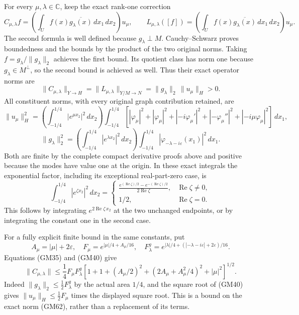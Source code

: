 \documentclass[
  11pt,
]{article}
\begin{document}
For every \(\mu,\lambda\in\mathbb C\), keep the exact rank-one correction
\[
 C_{\mu,\lambda}f
    =\left(\int_U f(x)\overline{g_\lambda(x)}\,dx_1\,dx_2\right)u_\mu,
 \qquad
 L_{\mu,\lambda}([f])
    =\left(\int_U f(x)\overline{g_\lambda(x)}\,dx_1\,dx_2\right)u_\mu .
 \tag{GM61}
\] The second formula is well defined because
\(g_\lambda\perp M\). Cauchy--Schwarz proves boundedness and the
bounds by the product of the two original norms. Taking
\(f=g_\lambda/\|g_\lambda\|_2\) achieves the first bound. Its quotient class
has norm one because \(g_\lambda\in M^\perp\), so the second bound is
achieved as well. Thus their exact operator norms are
\[
 \|C_{\mu,\lambda}\|_{Y\to H}
      =\|L_{\mu,\lambda}\|_{Y/M\to N}
      =\|g_\lambda\|_2\,\|u_\mu\|_H>0.
\] All constituent norms, with every original
graph contribution retained, are \[
 \|u_\mu\|_H^2
  =\left(\int_{-1/4}^{1/4}|e^{\mu x_2}|^2\,dx_2\right)
     \int_{-1/4}^{1/4}
       \left[
         |\varphi_\mu|^2+|\varphi_\mu|^2
         +|-i\varphi_\mu'|^2+|-\varphi_\mu''|^2
         +|-i\mu\varphi_\mu|^2
       \right]\,dx_1,
\]
\[
 \|g_\lambda\|_2^2
   =\left(\int_{-1/4}^{1/4}|e^{\lambda x_2}|^2\,dx_2\right)
            \int_{-1/4}^{1/4}|\varphi_{-\lambda-i\varepsilon}(x_1)|^2\,dx_1.
 \tag{GM62}
\] Both are finite by the complete compact
derivative proofs above and positive because the modes have value one at
the origin. In these exact integrals the exponential factor, including
its exceptional real-part-zero case, is \[
 \int_{-1/4}^{1/4}|e^{\zeta x_2}|^2\,dx_2
   =
   \begin{cases}
      \displaystyle
      \frac{e^{(\operatorname{Re}\zeta)/2}
                 -e^{-(\operatorname{Re}\zeta)/2}}
           {2\operatorname{Re}\zeta},
                     &\operatorname{Re}\zeta\neq0,\\[6pt]
      1/2,            &\operatorname{Re}\zeta=0 .
   \end{cases}
 \tag{GM63}
\] This
follows by integrating \(e^{2\operatorname{Re}\zeta\,x_2}\) at the two unchanged
endpoints, or by integrating the constant one in the second case.

For a fully explicit finite bound in the same constants, put
\[
 A_\mu=|\mu|+2\varepsilon,\quad
 F_\mu=e^{|\mu|/4+A_\mu/16},\quad
 F^g_\lambda=e^{|\lambda|/4+(|-\lambda-i\varepsilon|+2\varepsilon)/16}.
\] Equations (GM35) and (GM40) give
\[
 \|C_{\mu,\lambda}\|
     \leq\frac14 F_\mu F^g_\lambda
       \left[1+1+(A_\mu/2)^2+
              (2A_\mu+A_\mu^2/4)^2+|\mu|^2\right]^{1/2}.
 \tag{GM64}
\] Indeed \(\|g_\lambda\|_2\leq\frac12 F^g_\lambda\) by the
actual area \(1/4\), and the square root of (GM40)
gives \(\|u_\mu\|_H\leq\frac12 F_\mu\) times the displayed square root. This
is a bound on the exact norm (GM62), rather than a replacement of its
terms.
\end{document}
